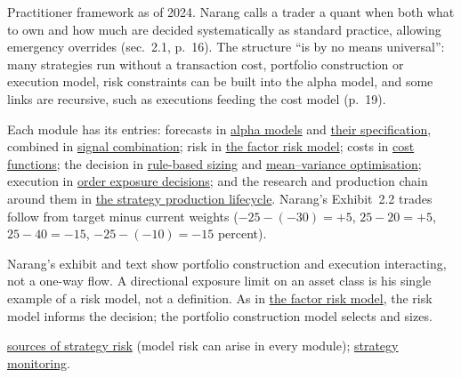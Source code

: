 \begin{qfdefinition}
 Practitioner framework as of 2024. Narang calls a trader a quant when both what to own and how much are decided systematically as standard practice, allowing emergency overrides (sec.~2.1, p.~16). The structure ``is by no means universal'': many strategies run without a transaction cost, portfolio construction or execution model, risk constraints can be built into the alpha model, and some links are recursive, such as executions feeding the cost model (p.~19).

 Each module has its entries: forecasts in \hyperref[def:alpha-model-taxonomy]{alpha models} and \hyperref[meth:alpha-strategy-specification]{their specification}, combined in \hyperref[meth:alpha-signal-combination]{signal combination}; risk in \hyperref[mod:factor-risk-model]{the factor risk model}; costs in \hyperref[mod:portfolio-transaction-cost-function]{cost functions}; the decision in \hyperref[meth:rule-based-position-sizing]{rule-based sizing} and \hyperref[mod:mean-variance-portfolio-optimisation]{mean--variance optimisation}; execution in \hyperref[def:order-exposure-decisions]{order exposure decisions}; and the research and production chain around them in \hyperref[meth:strategy-production-lifecycle]{the strategy production lifecycle}. Narang's Exhibit~2.2 trades follow from target minus current weights ($-25-(-30)=+5$, $25-20=+5$, $25-40=-15$, $-25-(-10)=-15$ percent).

 Narang's exhibit and text show portfolio construction and execution interacting, not a one-way flow. A directional exposure limit on an asset class is his single example of a risk model, not a definition. As in \hyperref[mod:factor-risk-model]{the factor risk model}, the risk model informs the decision; the portfolio construction model selects and sizes.

 \hyperref[def:quant-strategy-risk-sources]{sources of strategy risk} (model risk can arise in every module); \hyperref[meth:quant-strategy-monitoring]{strategy monitoring}.

\end{qfdefinition}

